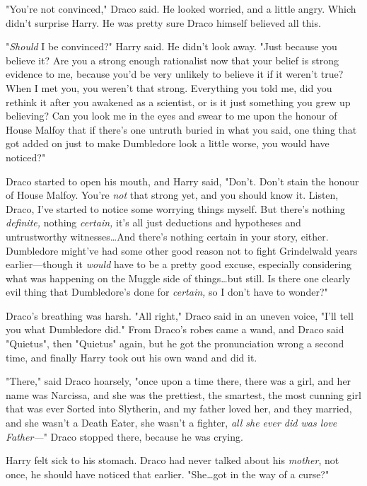 "You’re not convinced," Draco said. He looked worried, and a little angry.
Which didn’t surprise Harry. He was pretty sure Draco himself believed all this.

"\emph{Should} I be convinced?" Harry said. He didn’t look away. "Just because
you believe it? Are you a strong enough rationalist now that your belief is
strong evidence to me, because you’d be very unlikely to believe it if it
weren’t true? When I met you, you weren’t that strong. Everything you told me,
did you rethink it after you awakened as a scientist, or is it just something
you grew up believing? Can you look me in the eyes and swear to me upon the
honour of House Malfoy that if there’s one untruth buried in what you said, one
thing that got added on just to make Dumbledore look a little worse, you would
have noticed?"

Draco started to open his mouth, and Harry said, "Don’t. Don’t stain the honour
of House Malfoy. You’re \emph{not} that strong yet, and you should know it.
Listen, Draco, I’ve started to notice some worrying things myself. But there’s
nothing \emph{definite,} nothing \emph{certain,} it’s all just deductions and
hypotheses and untrustworthy witnesses…And there’s nothing certain in
your story, either. Dumbledore might’ve had some other good reason not to fight
Grindelwald years earlier—though it \emph{would} have to be a pretty good
excuse, especially considering what was happening on the Muggle side of
things…but still. Is there one clearly evil thing that Dumbledore’s
done for \emph{certain,} so I don’t have to wonder?"

Draco’s breathing was harsh. "All right," Draco said in an uneven voice, "I’ll
tell you what Dumbledore did." From Draco’s robes came a wand, and Draco said
"Quietus", then "Quietus" again, but he got the pronunciation wrong a second
time, and finally Harry took out his own wand and did it.

"There," said Draco hoarsely, "once upon a time there, there was a girl, and
her name was Narcissa, and she was the prettiest, the smartest, the most
cunning girl that was ever Sorted into Slytherin, and my father loved her, and
they married, and she wasn’t a Death Eater, she wasn’t a fighter, \emph{all she
ever did was love Father—}" Draco stopped there, because he was crying.

Harry felt sick to his stomach. Draco had never talked about his \emph{mother},
not once, he should have noticed that earlier. "She…got in the way of a
curse?"


